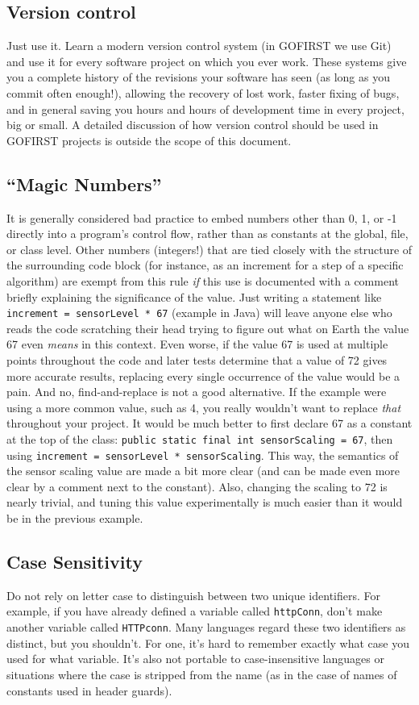 \documentclass[12pt]{article}
\newcommand{\code}[1]{\texttt{#1}}
\begin{document}
\subsection{Version control}
Just use it. Learn a modern version control system (in GOFIRST we use Git) and use it for every software project on which you ever work. These systems give you a complete history of the revisions your software has seen (as long as you commit often enough!), allowing the recovery of lost work, faster fixing of bugs, and in general saving you hours and hours of development time in every project, big or small. A detailed discussion of how version control should be used in GOFIRST projects is outside the scope of this document.

\subsection{``Magic Numbers''}
It is generally considered bad practice to embed numbers other than 0, 1, or -1 directly into a program's control flow, rather than as constants at the global, file, or class level. Other numbers (integers!) that are tied closely with the structure of the surrounding code block (for instance, as an increment for a step of a specific algorithm) are exempt from this rule \emph{if} this use is documented with a comment briefly explaining the significance of the value. Just writing a statement like \code{increment = sensorLevel * 67} (example in Java) will leave anyone else who reads the code scratching their head trying to figure out what on Earth the value 67 even \emph{means} in this context. Even worse, if the value 67 is used at multiple points throughout the code and later tests determine that a value of 72 gives more accurate results, replacing every single occurrence of the value would be a pain. And no, find-and-replace is not a good alternative. If the example were using a more common value, such as 4, you really wouldn't want to replace \emph{that} throughout your project. It would be much better to first declare 67 as a constant at the top of the class: \code{public static final int sensorScaling = 67}, then using \code{increment = sensorLevel * sensorScaling}. This way, the semantics of the sensor scaling value are made a bit more clear (and can be made even more clear by a comment next to the constant). Also, changing the scaling to 72 is nearly trivial, and tuning this value experimentally is much easier than it would be in the previous example.
\subsection{Case Sensitivity}
Do not rely on letter case to distinguish between two unique identifiers. For example, if you have already defined a variable called \code{httpConn}, don't make another variable called \code{HTTPconn}. Many languages regard these two identifiers as distinct, but you shouldn't. For one, it's hard to remember exactly what case you used for what variable. It's also not portable to case-insensitive languages or situations where the case is stripped from the name (as in the case of names of constants used in header guards).
\end{document}
